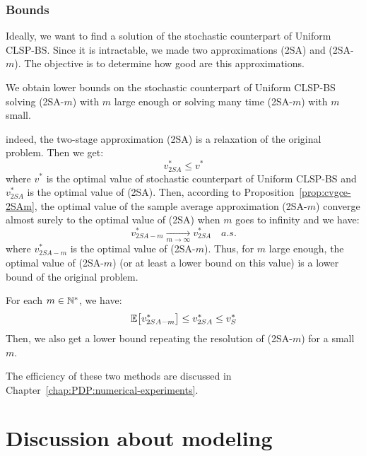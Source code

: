 

\subsubsection{Bounds}


Ideally, we want to find a solution of the stochastic counterpart of Uniform CLSP-BS. Since it is intractable, we made two approximations (2SA) and (2SA-$m$). The objective is to determine how good are this approximations.

We obtain lower bounds on the stochastic counterpart of Uniform CLSP-BS solving (2SA-$m$) with $m$ large enough or solving many time (2SA-$m$) with $m$ small.


indeed, the two-stage approximation (2SA) is a relaxation of the original problem. Then we get:
\begin{equation}
  v^*_{2SA} \le v^*
\end{equation}
where $v^*$ is the optimal value of stochastic counterpart of Uniform CLSP-BS and $v^*_{2SA}$ is the optimal value of (2SA).
Then, according to Proposition~\ref{prop:cvgce-2SAm}, the optimal value of the sample average approximation (2SA-$m$) converge almost surely to the optimal value of (2SA) when $m$ goes to infinity and we have:
\begin{equation}
  v^*_{2SA-m}  \xrightarrow[m\to\infty]{} v^*_{2SA} \quad a.s.
\end{equation}
where $v^*_{2SA-m}$ is the optimal value of (2SA-$m$).
Thus, for $m$ large enough, the optimal value of (2SA-$m$) (or at least a lower bound on this value) is a lower bound of the original problem.

For each $m\in\mathbb{N}^*$, we have:
\begin{equation}
  \espe\sqbracket{v^*_{2SA-m}}\le v^*_{2SA}\le v^*_S
\end{equation}
Then, we also get a lower bound repeating the resolution of (2SA-$m$) for a small $m$.


The efficiency of these two methods are discussed in Chapter~\ref{chap:PDP:numerical-experiments}.



\section{Discussion about modeling}
\label{sec:stoch-CLSP-BS-discussion}

